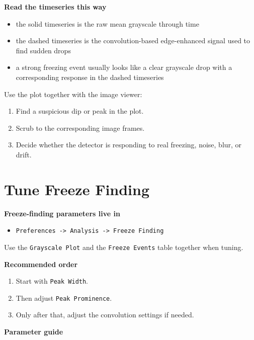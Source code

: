 \documentclass[
  9pt,
  letterpaper,
  oneside,
  open=any,
  DIV=15,
  parskip=half-,
  headings=big,
  numbers=noenddot
]{scrbook}
\newcommand{\manuallead}[1]{%
  \vspace{0.15em}%
  {\sffamily\bfseries\color{ManualBlue}#1}\par\nobreak\vspace{0.05em}%
}
\begin{document}
\manuallead{Read the timeseries this way}

\begin{itemize}[leftmargin=*,itemsep=0.35em,topsep=0.4em]
\item the solid timeseries is the raw mean grayscale through time
\item the dashed timeseries is the convolution-based edge-enhanced signal used to find sudden drops
\item a strong freezing event usually looks like a clear grayscale drop with a corresponding response in the dashed timeseries
\end{itemize}

Use the plot together with the image viewer:


\begin{enumerate}[leftmargin=*,itemsep=0.35em,topsep=0.4em]
\item Find a suspicious dip or peak in the plot.
\item Scrub to the corresponding image frames.
\item Decide whether the detector is responding to real freezing, noise, blur, or drift.
\end{enumerate}

\section{Tune Freeze Finding}

\manuallead{Freeze-finding parameters live in}

\begin{itemize}[leftmargin=*,itemsep=0.35em,topsep=0.4em]
\item \texttt{Preferences -> Analysis -> Freeze Finding}
\end{itemize}

Use the \texttt{Grayscale Plot} and the \texttt{Freeze Events} table together when tuning.


\manuallead{Recommended order}

\begin{enumerate}[leftmargin=*,itemsep=0.35em,topsep=0.4em]
\item Start with \texttt{Peak Width}.
\item Then adjust \texttt{Peak Prominence}.
\item Only after that, adjust the convolution settings if needed.
\end{enumerate}

\manuallead{Parameter guide}
\end{document}

